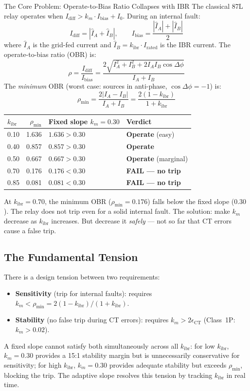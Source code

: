 \documentclass[12pt,a4paper]{article}
\newcommand{\kibr}{k_\mathrm{ibr}}
\newcommand{\Idiff}{I_\mathrm{diff}}
\newcommand{\Ibias}{I_\mathrm{bias}}
\newcommand{\km}{k_m}
\begin{document}
\begin{warnbox}{The Core Problem: Operate-to-Bias Ratio Collapses with IBR}
The classical 87L relay operates when $\Idiff > \km \cdot \Ibias + I_0$. During an internal fault:
\[
  \Idiff = |\hat{I}_A + \hat{I}_B|, \qquad \Ibias = \frac{|\hat{I}_A| + |\hat{I}_B|}{2}
\]
where $\hat{I}_A$ is the grid-fed current and $\hat{I}_B = \kibr \cdot I_\mathrm{rated}$ is the IBR current. The operate-to-bias ratio (OBR) is:
\begin{equation}
  \rho = \frac{\Idiff}{\Ibias} = \frac{2\sqrt{I_A^2 + I_B^2 + 2I_A I_B \cos\Delta\phi}}{I_A + I_B}
  \label{eq:rho_general}
\end{equation}
The \emph{minimum} OBR (worst case: sources in anti-phase, $\cos\Delta\phi = -1$) is:
\begin{equation}
  \rho_\mathrm{min} = \frac{2|I_A - I_B|}{I_A + I_B}
    = \frac{2(1-\kibr)}{1+\kibr}
  \label{eq:rho_min}
\end{equation}

\medskip
\begin{tabular}{@{}lrll@{}}
\toprule
$\kibr$ & $\rho_\mathrm{min}$ & Fixed slope $\km = 0.30$ & Verdict \\
\midrule
0.10 & 1.636 & $1.636 > 0.30$ & \textbf{Operate} (easy) \\
0.40 & 0.857 & $0.857 > 0.30$ & \textbf{Operate} \\
0.50 & 0.667 & $0.667 > 0.30$ & \textbf{Operate} (marginal) \\
0.70 & 0.176 & $0.176 < 0.30$ & \textbf{FAIL --- no trip} \\
0.85 & 0.081 & $0.081 < 0.30$ & \textbf{FAIL --- no trip} \\
\bottomrule
\end{tabular}

\medskip
At $\kibr = 0.70$, the minimum OBR ($\rho_\mathrm{min} = 0.176$) falls below the fixed slope ($0.30$). The relay does not trip even for a solid internal fault. The solution: make $\km$ decrease as $\kibr$ increases. But decrease it \emph{safely} --- not so far that CT errors cause a false trip.
\end{warnbox}

\subsection{The Fundamental Tension}

There is a design tension between two requirements:
\begin{itemize}[nosep]
  \item \textbf{Sensitivity} (trip for internal faults): requires $\km < \rho_\mathrm{min} = 2(1-\kibr)/(1+\kibr)$.
  \item \textbf{Stability} (no false trip during CT errors): requires $\km > 2\epsilon_\mathrm{CT}$ (Class~1P: $\km > 0.02$).
\end{itemize}
A fixed slope cannot satisfy both simultaneously across all $\kibr$: for low $\kibr$, $\km = 0.30$ provides a 15:1 stability margin but is unnecessarily conservative for sensitivity; for high $\kibr$, $\km = 0.30$ provides adequate stability but exceeds $\rho_\mathrm{min}$, blocking the trip. The adaptive slope resolves this tension by tracking $\kibr$ in real time.
\end{document}
